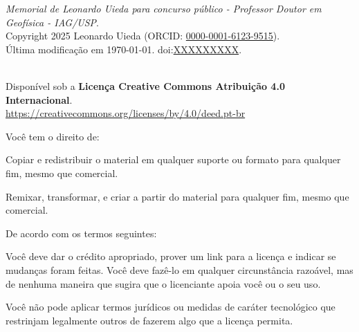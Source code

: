 \documentclass[10pt,a4paper,oneside]{book}
\newcommand{\ThesisYear}{2025}
\newcommand{\ThesisAuthor}{Leonardo Uieda}
\newcommand{\ThesisTitle}{Memorial de \ThesisAuthor{} para concurso público - Professor Doutor em Geofísica - IAG/USP}
\newcommand{\ThesisDOI}{XXXXXXXXX}
\newcommand{\ORCID}{0000-0001-6123-9515}
\begin{document}
{\small

\vspace*{\fill}

\noindent
\textit{\ThesisTitle{}}.
\\[0.2cm]
\textcopyright{} Copyright \ThesisYear{} \ThesisAuthor{} (ORCID:
\href{https://orcid.org/\ORCID}{\ORCID}).
\\[0.2cm]
Última modificação em \today.
doi:\href{https://doi.org/\ThesisDOI}{\ThesisDOI}.

\vspace{2.5cm}

\noindent
\textbf{\LARGE \faCreativeCommons{} \faCreativeCommonsBy{}}
\\
Disponível sob a
\textbf{Licença Creative Commons Atribuição 4.0 Internacional}.
\\
\url{https://creativecommons.org/licenses/by/4.0/deed.pt-br}

\vspace{0.25cm}

\noindent
Você tem o direito de:

\begin{description}[labelindent=0.5cm]
    \item[Compartilhar ---]{
        Copiar e redistribuir o material em qualquer suporte ou formato para
        qualquer fim, mesmo que comercial.
    }
    \item[Adaptar ---]{
        Remixar, transformar, e criar a partir do material para qualquer fim,
        mesmo que comercial.
    }
\end{description}

\vspace{0.25cm}

\noindent
De acordo com os termos seguintes:

\begin{description}[labelindent=0.5cm]
    \item[Atribuição ---]{
         Você deve dar o crédito apropriado, prover um link para a licença
         e indicar se mudanças foram feitas. Você deve fazê-lo em qualquer
         circunstância razoável, mas de nenhuma maneira que sugira que
         o licenciante apoia você ou o seu uso.
    }
    \item[Sem restrições adicionais ---]{
        Você não pode aplicar termos jurídicos ou medidas de caráter
        tecnológico que restrinjam legalmente outros de fazerem algo que
        a licença permita.
}
\end{description}

\vspace{1.5cm}

}
\end{document}
